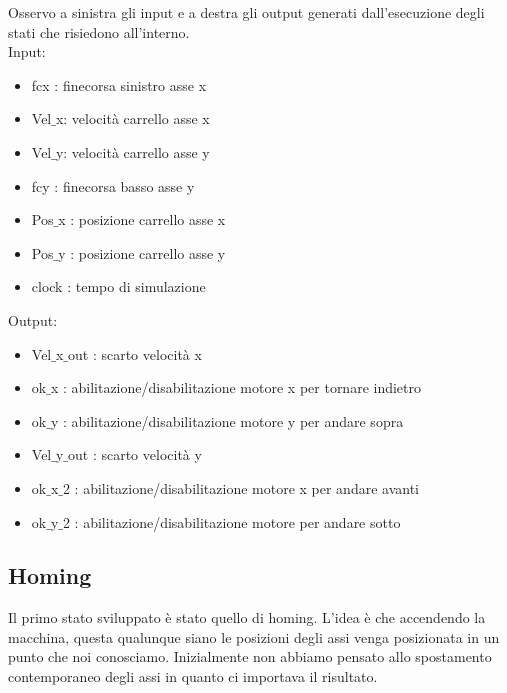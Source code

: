 \documentclass{article}
\begin{document}
Osservo a sinistra gli input e a destra gli output generati dall'esecuzione degli stati che risiedono all'interno.\\
Input:
\begin{itemize}
    \item fcx : finecorsa sinistro asse x
    \item Vel$\_$x: velocità carrello asse x
    \item Vel$\_$y: velocità carrello asse y
    \item fcy : finecorsa basso asse y
    \item Pos$\_$x : posizione carrello asse x
    \item Pos$\_$y : posizione carrello asse y
    \item clock : tempo di simulazione
\end{itemize}
Output:
\begin{itemize}
    \item Vel$\_$x$\_$out : scarto velocità x
    \item ok$\_$x : abilitazione/disabilitazione motore x per tornare indietro
    \item ok$\_$y : abilitazione/disabilitazione motore y per andare sopra
    \item Vel$\_$y$\_$out : scarto velocità y
    \item ok$\_$x$\_$2 : abilitazione/disabilitazione motore x per andare avanti
    \item ok$\_$y$\_$2 :  abilitazione/disabilitazione motore per andare sotto
\end{itemize}
\subsection{Homing}
Il primo stato sviluppato è stato quello di homing. L'idea è che accendendo la macchina, questa qualunque siano le posizioni degli assi venga posizionata in un punto che noi conosciamo. Inizialmente non abbiamo pensato allo spostamento contemporaneo degli assi in quanto ci importava il risultato.
\end{document}
